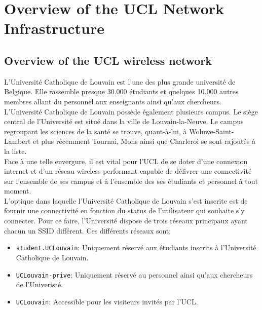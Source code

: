 
\chapter{Overview of the UCL Network Infrastructure} %

\label{Chapter2} %



\section{Overview of the UCL wireless network}
L'Université Catholique de Louvain est l'une des plus grande université de Belgique. Elle rassemble presque 30.000 étudiants et quelques 10.000 autres membres allant du personnel aux enseignants ainsi qu'aux chercheurs.\\
L'Université Catholique de Louvain possède également plusieurs campus. Le siège central de l'Université est situé dans la ville de Louvain-la-Neuve. Le campus regroupant les sciences de la santé se trouve, quant-à-lui, à Woluwe-Saint-Lambert et plus récemment Tournai, Mons ainsi que Charleroi se sont rajoutés à la liste.\\
Face à une telle envergure, il est vital pour l'UCL de se doter d'une connexion internet et d'un réseau wireless performant capable de délivrer une connectivité sur l'ensemble de ses campus et à l'ensemble des ses étudiants et personnel à tout moment.\\
L'optique dans laquelle l'Université Catholique de Louvain s'est inscrite est de fournir une connectivité en fonction du status de l'utilisateur qui souhaite s'y connecter. Pour ce faire, l'Université dispose de trois réseaux principaux ayant chacun un SSID différent. Ces différents réseaux sont:
\begin{itemize}
	\item \texttt{student.UCLouvain}: Uniquement réservé aux étudiants inscrits à l'Université Catholique de Louvain.
	\item \texttt{UCLouvain-prive}: Uniquement réservé au personnel ainsi qu'aux chercheurs de l'Univeristé.
	\item \texttt{UCLouvain}: Accessible pour les visiteurs invités par l'UCL.
\end{itemize}

